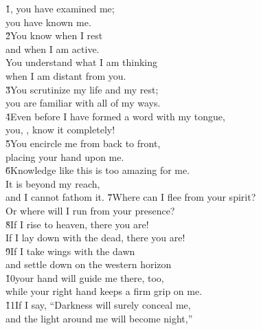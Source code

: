 \begin{poetry}
\poeml \v{1}, you have examined me; \\
\poemll    you have known me. \\
\poeml \v{2}You know when I rest \\
\poemll    and when I am active. \\
\poeml You understand what I am thinking \\
\poemll    when I am distant from you. \\
\poeml \v{3}You scrutinize my life and my rest; \\
\poemll    you are familiar with all of my ways. \\
\poeml \v{4}Even before I have formed a word with my tongue, \\
\poemll    you, , know it completely! \\
\poeml \v{5}You encircle me from back to front, \\
\poemll    placing your hand upon me. \\
\poeml \v{6}Knowledge like this is too amazing for me. \\
\poemll    It is beyond my reach, \\
\poemlll       and I cannot fathom it.
\poeml \v{7}Where can I flee from your spirit? \\
\poemll    Or where will I run from your presence? \\
\poeml \v{8}If I rise to heaven, there you are! \\
\poemll    If I lay down with the dead, there you are! \\
\poeml \v{9}If I take wings with the dawn \\
\poemll    and settle down on the western horizon \\
\poeml \v{10}your hand will guide me there, too, \\
\poemll    while your right hand keeps a firm grip on me. \\
\poeml \v{11}If I say, ``Darkness will surely conceal me, \\
\poemll    and the light around me will become night,'' \\

\end{poetry}
